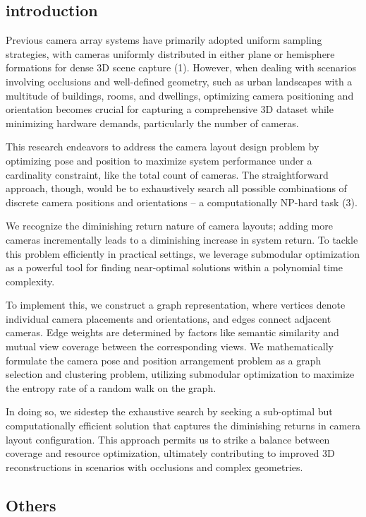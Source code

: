 \subsection{introduction}
Previous camera array systems have primarily adopted uniform sampling strategies, with cameras uniformly distributed in either plane or hemisphere formations for dense 3D scene capture (1). However, when dealing with scenarios involving occlusions and well-defined geometry, such as urban landscapes with a multitude of buildings, rooms, and dwellings, optimizing camera positioning and orientation becomes crucial for capturing a comprehensive 3D dataset while minimizing hardware demands, particularly the number of cameras.

This research endeavors to address the camera layout design problem by optimizing pose and position to maximize system performance under a cardinality constraint, like the total count of cameras. The straightforward approach, though, would be to exhaustively search all possible combinations of discrete camera positions and orientations – a computationally NP-hard task (3).

We recognize the diminishing return nature of camera layouts; adding more cameras incrementally leads to a diminishing increase in system return. To tackle this problem efficiently in practical settings, we leverage submodular optimization as a powerful tool for finding near-optimal solutions within a polynomial time complexity.

To implement this, we construct a graph representation, where vertices denote individual camera placements and orientations, and edges connect adjacent cameras. Edge weights are determined by factors like semantic similarity and mutual view coverage between the corresponding views. We mathematically formulate the camera pose and position arrangement problem as a graph selection and clustering problem, utilizing submodular optimization to maximize the entropy rate of a random walk on the graph.

In doing so, we sidestep the exhaustive search by seeking a sub-optimal but computationally efficient solution that captures the diminishing returns in camera layout configuration. This approach permits us to strike a balance between coverage and resource optimization, ultimately contributing to improved 3D reconstructions in scenarios with occlusions and complex geometries.


\subsection{Others}

